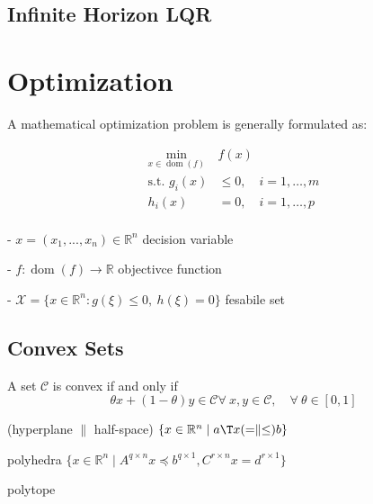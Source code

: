 

\subsection{Infinite Horizon LQR}

\section{Optimization}


A mathematical optimization problem is generally formulated as:

\begin{equation}
	\begin{aligned}
		\min_{x\in\operatorname{dom}(f)}          & f(x)                      \\
		\text{s.t. }                       g_i(x) & \le 0,\quad i = 1,\dots,m \\
		h_i(x)                                    & = 0,\quad i = 1,\dots,p   \\
	\end{aligned}
	\label{eq:optimization}
\end{equation}

- $x = (x_1,...,x_n) \in \mathbb{R}^{n}$ decision variable

- $f: \operatorname{dom}(f)\to\mathbb{R}$ objectivce function

- $\mathcal{X} = \{x \in \mathbb{R}^{n}: g(\xi)\le0,\ h(\xi)=0\}$ fesabile set


\subsection{Convex Sets}

\begin{definition}
	A set $\mathcal{C}$ is convex if and only if
	$$\theta x + (1-\theta)y \in \mathcal{C}
		\forall\ x,y \in \mathcal{C},\quad
		\forall\ \theta \in [0,1]$$
\end{definition}

(hyperplane $\parallel$ half-space)
$\{x \in \mathbb{R}^n \mid a\T x(=\parallel\le)b\}$

polyhedra $\{x\in\mathbb{R}^n\mid A^{q\times n}x\preceq b^{q\times1},C^{r\times n}x=d^{r\times1}\}$

polytope

